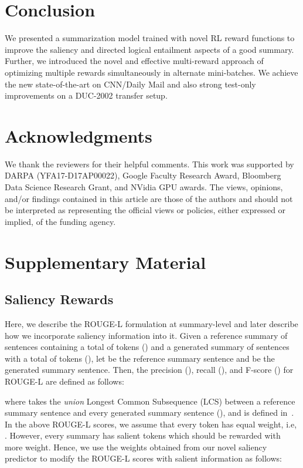 \documentclass[11pt,a4paper]{article}
\begin{document}
\section{Conclusion}
We presented a summarization model trained with novel RL reward functions to improve the saliency and directed logical entailment aspects of a good summary. Further, we introduced the novel and effective multi-reward approach of optimizing multiple rewards simultaneously in alternate mini-batches. We achieve the new state-of-the-art on CNN/Daily Mail and also strong test-only improvements on a DUC-2002 transfer setup.

\section*{Acknowledgments}
We thank the reviewers for their helpful comments. This work was supported by DARPA (YFA17-D17AP00022), Google Faculty Research Award, Bloomberg Data Science Research Grant, and NVidia GPU awards. The views, opinions, and/or findings contained in this article are those of the authors and should not be interpreted as representing the official views or policies, either expressed or implied, of the funding agency.




\appendix
\section{Supplementary Material}
\subsection{Saliency Rewards}
\label{suppl:subsec:saliency-rewards}
Here, we describe the ROUGE-L formulation at summary-level and later describe how we incorporate saliency information into it. Given a reference summary of  sentences containing a total of  tokens () and a generated summary of  sentences with a total of  tokens (), let  be the reference summary sentence and  be the generated summary sentence. Then, the precision (), recall (), and F-score () for ROUGE-L are defined as follows:



where  takes the \emph{union} Longest Common Subsequence (LCS) between a reference summary sentence  and every generated summary sentence  (), and  is defined in~. In the above ROUGE-L scores, we assume that every token has equal weight, i.e, . However, every summary has salient tokens which should be rewarded with more weight. Hence, we use the weights obtained from our novel saliency predictor to modify the ROUGE-L scores with salient information as follows:
\end{document}
